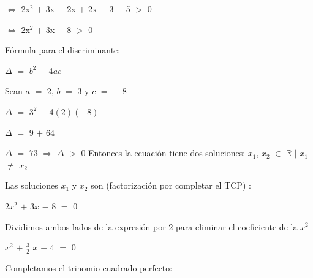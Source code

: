 \documentclass[12pt]{article}
\begin{document}
\hspace{5.6cm} $\Longleftrightarrow$ \hspace{0.2cm} 2x$^{2}$ $+$ 3x $-$ 2x $+$ 2x $-$ 3 $-$ 5 $>$ $0$ \vspace{0.5cm}

\hspace{5.6cm} $\Longleftrightarrow$ \hspace{0.2cm} 2x$^{2}$ $+$ 3x $-$ 8 $>$ $0$ \vspace{0.5cm}

Fórmula para el discriminante:\vspace{0.5cm}

$\Delta$ $=$ $b^{2}$ $-$ 4$a$$c$ \vspace{0.2cm}

Sean $a$ $=$ 2, \hspace{0.3cm} $b$ $=$ 3 \hspace{0.3cm} y \hspace{0.3cm} $c$ $=$ $-$ 8 \vspace{0.3cm}

$\Delta$ $=$ $3^{2}$ $-$ 4$(2)$$(-8)$ \vspace{0.3cm}

$\Delta$ $=$ $9$ $+$ $64$ \vspace{0.3cm}

$\Delta$ $=$ $73$ \hspace{0.3cm} $\Longrightarrow$ \hspace{0.3cm} 
$\Delta$ $>$ $0$ \hspace{0.1cm} Entonces la ecuación tiene dos soluciones: $x_{1}$, $x_{2}$ $\in$ $\mathbb{R}$ $\mid$ $x_{1}$ $\neq$ $x_{2}$ 

 \newpage
 
 Las soluciones $x_{1}$ y $x_{2}$ son (factorización por completar el TCP) : \vspace{0.5cm}
 
\hspace{4cm} $2x^{2}$ $+$ $3x$ $-$ $8$ $=$ $0$ \vspace{0.5cm}
 
Dividimos ambos lados de la expresión por $2$ para eliminar el coeficiente de la $x^{2}$ \vspace{0.5cm}

\hspace{4cm} $x^{2}$ $+$ {\Large{$\frac{3}{2}$}} $x$ $-$ $4$ $=$ $0$ \vspace{0.5cm}

Completamos el trinomio cuadrado perfecto:\vspace{0.5cm}
\end{document}
